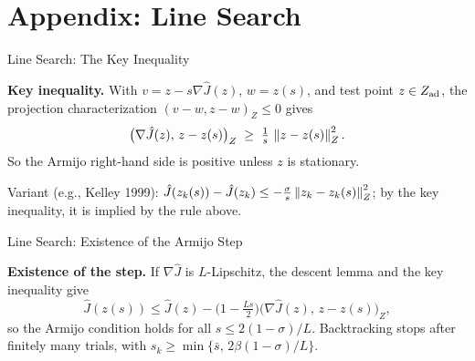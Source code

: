 \documentclass[main.tex]{subfiles}
\begin{document}
\section{Appendix: Line Search}

\begin{frame}[label=lsdetails]{Line Search: The Key Inequality}
  \begin{hlbox}
    \textbf{Key inequality.} With $v = z - s\nabla\hat J(z)$, $w = z(s)$, and test point $z \in Z_{\rm ad}$, the projection characterization $(v - w, z - w)_Z \le 0$ gives
    \[
      \big(\nabla\hat J(z),\, z - z(s)\big)_Z \;\ge\; \tfrac{1}{s}\,\left\lVert z - z(s) \right\rVert_Z^2 .
    \]
    So the Armijo right-hand side is positive unless $z$ is stationary.
  \end{hlbox}

  \begin{qbox}
    Variant (e.g., Kelley 1999): \; $\hat J(z_k(s)) - \hat J(z_k) \le -\tfrac{\sigma}{s}\left\lVert z_k - z_k(s) \right\rVert_Z^2$; by the key inequality, it is implied by the rule above.
  \end{qbox}
  \vfill\hfill\hyperlink{armijo<3>}{}
\end{frame}

\begin{frame}{Line Search: Existence of the Armijo Step}
  \begin{hlbox}
    \textbf{Existence of the step.} If $\nabla\hat J$ is $L$-Lipschitz, the descent lemma and the key inequality give
    \[
      \hat J(z(s)) \le \hat J(z) - \big(1 - \tfrac{Ls}{2}\big)\big(\nabla\hat J(z),\, z - z(s)\big)_Z,
    \]
    so the Armijo condition holds for all $s \le 2(1 - \sigma)/L$. Backtracking stops after finitely many trials, with $s_k \ge \min\{\bar s,\, 2\beta(1 - \sigma)/L\}$.
  \end{hlbox}
  \vfill\hfill\hyperlink{armijo<3>}{}
\end{frame}
\end{document}
